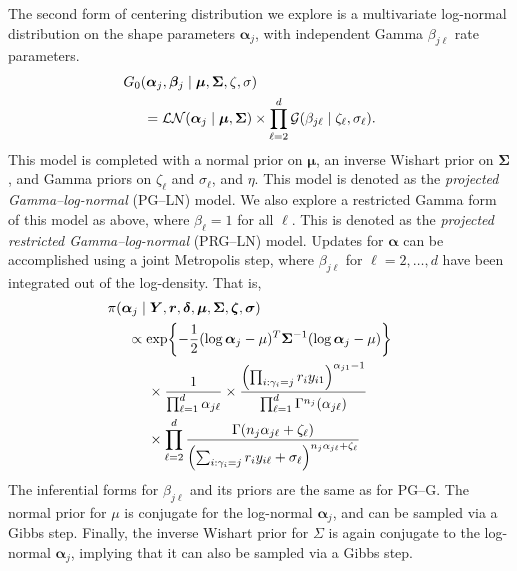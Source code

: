 The second form of centering distribution we explore is a multivariate log-normal distribution on the shape parameters $\bm{\alpha}_j$, with independent Gamma $\beta_{j\ell}$ rate parameters.  
\begin{equation}
    \begin{aligned}
    &\hspace{-0.5cm}G_0\left(\bm{\alpha}_j,\bm{\beta}_j\mid\bm{\mu},\bm{\Sigma},\zeta,\sigma\right) \\
    &=\mathcal{LN}\left(\bm{\alpha}_j\mid\bm{\mu},\bm{\Sigma}\right)\times\prod_{\ell = 2}^d\mathcal{G}\left(\beta_{j\ell}\mid\zeta_{\ell},\sigma_{\ell}\right).
    \end{aligned}
\end{equation}
This model is completed with a normal prior on $\bm{\mu}$, an inverse Wishart prior on $\bm{\Sigma}$, and Gamma priors on $\zeta_{\ell}$ and $\sigma_{\ell}$, and $\eta$.  This model is denoted as the \emph{projected Gamma--log-normal} (PG--LN) model.  We also explore a restricted Gamma form of this model as above, where $\beta_{\ell} = 1$ for all $\ell$.  This is denoted as the \emph{projected restricted Gamma--log-normal} (PRG--LN) model.  Updates for $\bm{\alpha}$ can be accomplished using a joint Metropolis step, where $\beta_{j\ell}$ for $\ell = 2,\ldots,d$ have been integrated out of the log-density.  That is,
\begin{equation*}
    \begin{aligned}
    &\hspace{-0.5cm}\pi(\bm{\alpha}_j\mid\bm{Y},\bm{r},\bm{\delta},\bm{\mu},\bm{\Sigma},\bm{\zeta},\bm{\sigma})\\
    &\propto \exp\left\lbrace-\frac{1}{2}(\log\bm{\alpha}_j - \mu)^T\bm{\Sigma}^{-1}(\log\bm{\alpha}_j - \mu)\right\rbrace \\
    &\hspace{0.5cm}\times\frac{1}{\prod_{\ell = 1}^d\alpha_{j\ell}}\times \frac{\left(\prod_{i:\gamma_i = j}r_iy_{i1}\right)^{\alpha_{j1} - 1}}{\prod_{\ell = 1}^d\Gamma^{n_j}(\alpha_{j\ell})}\\
    &\hspace{0.5cm}\times \prod_{\ell = 2}^d\frac{\Gamma\left(n_j\alpha_{j\ell} + \zeta_{\ell}\right)}{\left(\sum_{i:\gamma_i = j}r_iy_{i\ell} + \sigma_{\ell}\right)^{n_j\alpha_{j\ell} + \zeta_{\ell}}}
    \end{aligned}
\end{equation*}
The inferential forms for $\beta_{j\ell}$ and its priors are the same as for PG--G.  The 
  normal prior for $\mu$ is conjugate for the log-normal $\bm{\alpha}_j$, and can be sampled
  via a Gibbs step.  Finally, the inverse Wishart prior for $\Sigma$ is again conjugate to
  the log-normal $\bm{\alpha}_j$, implying that it can also be sampled via a Gibbs step.

